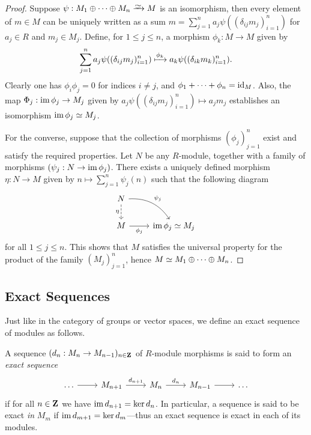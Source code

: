\begin{proof}
    Suppose \(\psi: M_1 \oplus \dots \oplus M_n \isoto M\) is an isomorphism, then
    every element of \(m \in M\) can be uniquely written as a sum
    \(m = \sum_{j=1}^n a_j \psi((\delta_{ij} m_j)_{i=1}^n)\) for \(a_j \in R\) and
    \(m_j \in M_j\). Define, for \(1 \leq j \leq n\), a morphism \(\phi_k: M \to M\)
    given by
    \[
        \sum_{j=1}^n a_j \psi((\delta_{ij} m_j)_{i=1}^n)
        \xmapsto{\phi_k} a_k \psi((\delta_{i k} m_k)_{i=1}^n).
    \]
    Clearly one has \(\phi_i \phi_j = 0\) for indices \(i \neq j\), and
    \(\phi_1 + \dots + \phi_n = \operatorname{id}_M\). Also, the map
    \(\Phi_j: \operatorname{im} \phi_j \to M_j\) given by
    \(a_j \psi((\delta_{i j} m_j)_{i=1}^n) \mapsto a_j m_j\) establishes an
    isomorphism \(\operatorname{im} \phi_j \simeq M_j\).

    For the converse, suppose that the collection of morphisms \((\phi_j)_{j=1}^n\)
    exist and satisfy the required properties. Let \(N\) be any \(R\)-module,
    together with a family of morphisms \((\psi_j: N \to \operatorname{im} \phi_j)\). There
    exists a uniquely defined morphism \(\eta: N \to M\) given by
    \(n \mapsto \sum_{j=1}^n \psi_j(n)\) such that the following diagram
    \[
        \begin{tikzcd}
            N \ar[d, "\eta"', dashed] \ar[rd, bend left, "\psi_j"] &\\
            M \ar[r, "\phi_j"'] &\im \phi_j \iso M_j
        \end{tikzcd}
    \]
    for all \(1 \leq j \leq n\). This shows that \(M\) satisfies the universal
    property for the product of the family \((M_j)_{j=1}^n\), hence
    \(M \simeq M_1 \oplus \dots \oplus M_n\).
\end{proof}

\subsection{Exact Sequences}

Just like in the category of groups or vector spaces, we define an exact
sequence of modules as follows.

\begin{definition}
    \label{def:exact-sequence-modules}
    A sequence \((d_n: M_n \to M_{n-1})_{n \in \mathbf{Z}}\) of \(R\)-module morphisms is
    said to form an \emph{exact sequence}
    \[
        \begin{tikzcd}
            \dots \ar[r] &M_{n+1} \ar[r, "d_{n+1}"]
            &M_n \ar[r, "d_n"] &M_{n-1} \ar[r] &\dots
        \end{tikzcd}
    \]
    if for all \(n \in \mathbf{Z}\) we have \(\operatorname{im} d_{n+1} = \ker d_n\). In particular, a
    sequence is said to be exact \emph{in} \(M_m\) if
    \(\operatorname{im} d_{m + 1} = \ker d_m\)---thus an exact sequence is exact in each of its
    modules.
\end{definition}

